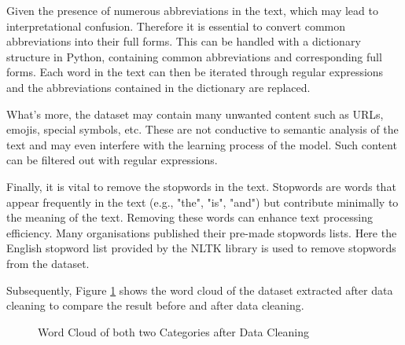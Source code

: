 \documentclass[ %
                    author={Bocheng Wang},
                supervisor={Dr. Qiang Liu},
                    degree={MSc},
                     title={A Research on Identification of Suicide Ideation in Texts with Multiple Models},
                      type={},
                      year={2024}]{dissertation}
\begin{document}
Given the presence of numerous abbreviations in the text, which may lead to interpretational confusion. Therefore it is essential to convert common abbreviations into their full forms. This can be handled with a dictionary structure in Python, containing common abbreviations and corresponding full forms. Each word in the text can then be iterated through regular expressions and the abbreviations contained in the dictionary are replaced.

What's more, the dataset may contain many unwanted content such as URLs, emojis, special symbols, etc. These are not conductive to semantic analysis of the text and may even interfere with the learning process of the model. Such content can be filtered out with regular expressions.

Finally, it is vital to remove the stopwords in the text. Stopwords are words that appear frequently in the text (e.g., "the", "is", "and") but contribute minimally to the meaning of the text. Removing these words can enhance text processing efficiency. Many organisations published their pre-made stopwords lists. Here the English stopword list provided by the NLTK library is used to remove stopwords from the dataset.

Subsequently, Figure \ref{fig:word cloud clean} shows the word cloud of the dataset extracted after data cleaning to compare the result before and after data cleaning.

\begin{figure}[h]
      \centering
      \hfil
      \caption{Word Cloud of both two Categories after Data Cleaning}
      \label{fig:word cloud clean}
\end{figure}
\end{document}
